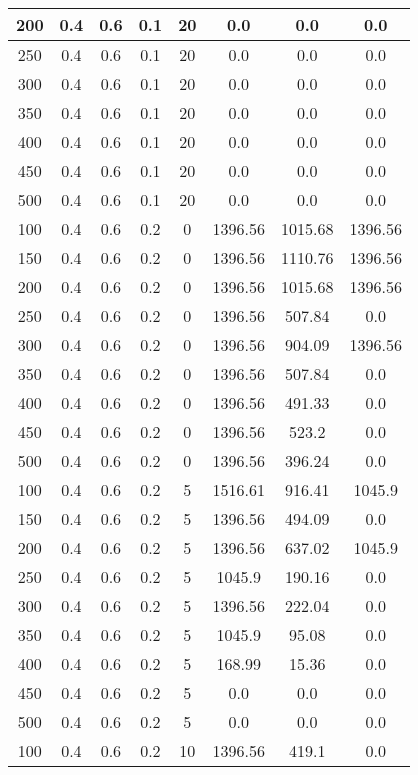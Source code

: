 \documentclass[a4paper, 12pt]{extreport}
\begin{document}
\begin{itemize}
\begin{longtable}{|c|c|c|c|c|c|c|c|}
			200 & 0.4 & 0.6 & 0.1 & 20 & 0.0 & 0.0 & 0.0 \\\hline
			250 & 0.4 & 0.6 & 0.1 & 20 & 0.0 & 0.0 & 0.0 \\\hline
			300 & 0.4 & 0.6 & 0.1 & 20 & 0.0 & 0.0 & 0.0 \\\hline
			350 & 0.4 & 0.6 & 0.1 & 20 & 0.0 & 0.0 & 0.0 \\\hline
			400 & 0.4 & 0.6 & 0.1 & 20 & 0.0 & 0.0 & 0.0 \\\hline
			450 & 0.4 & 0.6 & 0.1 & 20 & 0.0 & 0.0 & 0.0 \\\hline
			500 & 0.4 & 0.6 & 0.1 & 20 & 0.0 & 0.0 & 0.0 \\\hline
			100 & 0.4 & 0.6 & 0.2 & 0 & 1396.56 & 1015.68 & 1396.56 \\\hline
			150 & 0.4 & 0.6 & 0.2 & 0 & 1396.56 & 1110.76 & 1396.56 \\\hline
			200 & 0.4 & 0.6 & 0.2 & 0 & 1396.56 & 1015.68 & 1396.56 \\\hline
			250 & 0.4 & 0.6 & 0.2 & 0 & 1396.56 & 507.84 & 0.0 \\\hline
			300 & 0.4 & 0.6 & 0.2 & 0 & 1396.56 & 904.09 & 1396.56 \\\hline
			350 & 0.4 & 0.6 & 0.2 & 0 & 1396.56 & 507.84 & 0.0 \\\hline
			400 & 0.4 & 0.6 & 0.2 & 0 & 1396.56 & 491.33 & 0.0 \\\hline
			450 & 0.4 & 0.6 & 0.2 & 0 & 1396.56 & 523.2 & 0.0 \\\hline
			500 & 0.4 & 0.6 & 0.2 & 0 & 1396.56 & 396.24 & 0.0 \\\hline
			100 & 0.4 & 0.6 & 0.2 & 5 & 1516.61 & 916.41 & 1045.9 \\\hline
			150 & 0.4 & 0.6 & 0.2 & 5 & 1396.56 & 494.09 & 0.0 \\\hline
			200 & 0.4 & 0.6 & 0.2 & 5 & 1396.56 & 637.02 & 1045.9 \\\hline
			250 & 0.4 & 0.6 & 0.2 & 5 & 1045.9 & 190.16 & 0.0 \\\hline
			300 & 0.4 & 0.6 & 0.2 & 5 & 1396.56 & 222.04 & 0.0 \\\hline
			350 & 0.4 & 0.6 & 0.2 & 5 & 1045.9 & 95.08 & 0.0 \\\hline
			400 & 0.4 & 0.6 & 0.2 & 5 & 168.99 & 15.36 & 0.0 \\\hline
			450 & 0.4 & 0.6 & 0.2 & 5 & 0.0 & 0.0 & 0.0 \\\hline
			500 & 0.4 & 0.6 & 0.2 & 5 & 0.0 & 0.0 & 0.0 \\\hline
			100 & 0.4 & 0.6 & 0.2 & 10 & 1396.56 & 419.1 & 0.0 \\\hline

\end{longtable}
\end{itemize}
\end{document}
